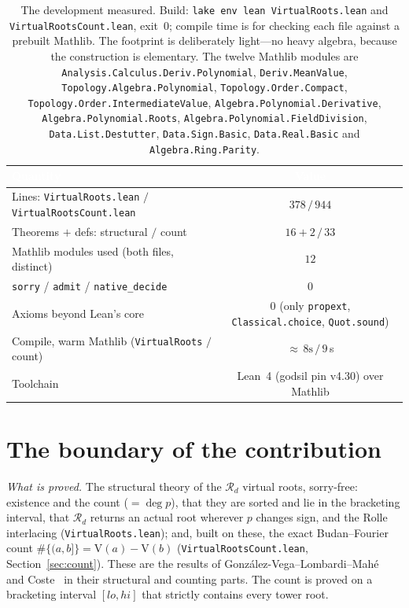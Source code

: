 \documentclass[11pt]{article}
\newcommand{\lean}[1]{\texttt{#1}}
\newcommand{\V}{\mathrm{V}}
\newcommand{\Rd}{\mathcal{R}}
\begin{document}
\begin{table}[H]
  \centering\footnotesize
  \begin{tabular}{@{}lc@{}}
    \toprule
    \rowcolor{ggteal}
    \textcolor{white}{\textbf{Quantity}} & \textcolor{white}{\textbf{Value}} \\
    \midrule
    \rowcolor{ggband}
    Lines: \lean{VirtualRoots.lean} $/$ \lean{VirtualRootsCount.lean} & $378\,/\,944$ \\
    Theorems $+$ defs: structural $/$ count & $16{+}2\,/\,33$ \\
    \rowcolor{ggband}
    Mathlib modules used (both files, distinct) & $12$ \\
    \lean{sorry} / \lean{admit} / \lean{native\_decide} & $0$ \\
    Axioms beyond Lean's core & $0$ (only \lean{propext}, \lean{Classical.choice}, \lean{Quot.sound}) \\
    \rowcolor{ggband}
    Compile, warm Mathlib (\lean{VirtualRoots} $/$ count) & ${\approx}\,8\text{s}\,/\,9$\,s \\
    Toolchain & Lean~4 (godsil pin v4.30) over Mathlib \\
    \bottomrule
  \end{tabular}
  \caption{The development measured. Build: \lean{lake env lean VirtualRoots.lean} and
  \lean{VirtualRootsCount.lean}, exit~0; compile time is for checking each file against a prebuilt
  Mathlib. The footprint is deliberately light---no heavy algebra, because the construction is
  elementary. The twelve Mathlib modules are \lean{Analysis.Calculus.Deriv.Polynomial},
  \lean{Deriv.MeanValue}, \lean{Topology.Algebra.Polynomial}, \lean{Topology.Order.Compact},
  \lean{Topology.Order.IntermediateValue}, \lean{Algebra.Polynomial.Derivative},
  \lean{Algebra.Polynomial.Roots}, \lean{Algebra.Polynomial.FieldDivision}, \lean{Data.List.Destutter},
  \lean{Data.Sign.Basic}, \lean{Data.Real.Basic} and \lean{Algebra.Ring.Parity}.}
  \label{tab:metrics}
\end{table}

\section{The boundary of the contribution}\label{sec:boundary}

\emph{What is proved.} The structural theory of the $\Rd_d$ virtual roots, sorry-free: existence and
the count ($=\deg p$), that they are sorted and lie in the bracketing interval, that $\Rd_d$ returns
an actual root wherever $p$ changes sign, and the Rolle interlacing (\lean{VirtualRoots.lean}); and,
built on these, the exact Budan--Fourier count $\#\{(a,b]\}=\V(a)-\V(b)$
(\lean{VirtualRootsCount.lean}, Section~\ref{sec:count}). These are the results of
Gonz\'alez-Vega--Lombardi--Mah\'e~\cite{glm} and Coste~\cite{coste} in their structural and counting
parts. The count is proved on a bracketing interval $[lo,hi]$ that strictly contains every tower root.
\end{document}
